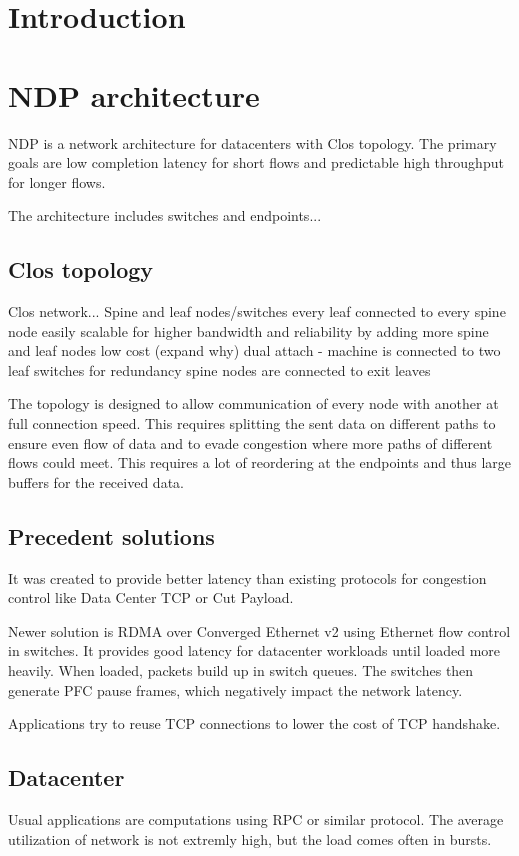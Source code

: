 \chapter{Introduction}


\chapter{NDP architecture}
NDP is a network architecture for datacenters with Clos topology. 
The primary goals are low completion latency for short flows and predictable high throughput for longer flows.

The architecture includes switches and endpoints...


\section{Clos topology}
Clos network...
Spine and leaf nodes/switches
every leaf connected to every spine node
easily scalable for higher bandwidth and reliability by adding more spine and leaf nodes
low cost (expand why)
dual attach - machine is connected to two leaf switches for redundancy
spine nodes are connected to exit leaves

The topology is designed to allow communication of every node with another at full connection speed.
This requires splitting the sent data on different paths to ensure even flow of data and to evade congestion where more paths of different flows could meet.
This requires a lot of reordering at the endpoints and thus large buffers for the received data.


\section{Precedent solutions}
It was created to provide better latency than existing protocols for congestion control like Data Center TCP or Cut Payload.

Newer solution is RDMA over Converged Ethernet v2 using Ethernet flow control in switches. It provides good latency for datacenter workloads until loaded more heavily.
When loaded, packets build up in switch queues. The switches then generate PFC pause frames, which negatively impact the network latency.

Applications try to reuse TCP connections to lower the cost of TCP handshake.


\section{Datacenter}
Usual applications are computations using RPC or similar protocol. The average utilization of network is not extremly high, but the load comes often in bursts.

